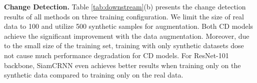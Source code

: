 
\noindent
\textbf{Change Detection.} Table \ref{tab:downstream}(b) presents the change detection results of all methods on three training configuration. We limit the size of real data to 100 and utilize 500 synthetic samples for augmentation. Both CD models achieve the significant improvement with the data augmentation. Moreover, due to the small size of the training set, training with only synthetic datasets dose not cause much performance degradation for CD models. For ResNet-101 backbone, SiamCRNN \cite{siamcrnn} even achieves better results when training only on the synthetic data compared to training only on the real data.

